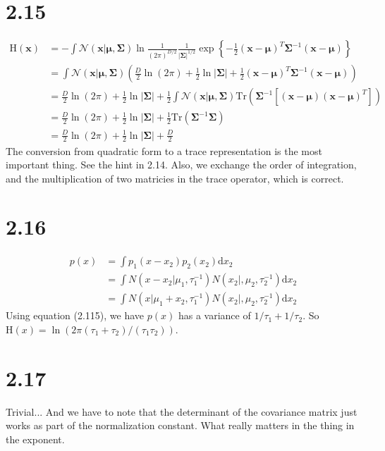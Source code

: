 \documentclass[12pt]{article}
\newcommand{\vect}[1]{\mathbf{#1}}
\begin{document}
\section{2.15}
\begin{align}
    \mathrm{H}(\vect{x} ) &= -\int \mathcal{N}(\vect{x}|\boldsymbol{\mu}, \boldsymbol{\Sigma}) \ln\frac{1}{(2\pi)^{D/2}} \frac{1}{|\boldsymbol{\Sigma}|^{1/2}} \exp\left\{-\frac{1}{2}(\vect{x} - \boldsymbol{\mu})^T \boldsymbol{\Sigma}^{-1} (\vect{x} - \boldsymbol{\mu}) \right\}  \\
    &=\int \mathcal{N}(\vect{x}|\boldsymbol{\mu}, \boldsymbol{\Sigma}) 
    (\frac{D}{2}  \ln (2\pi)+\frac{1}{2}\ln|\boldsymbol{\Sigma}| + \frac{1}{2}(\vect{x} - \boldsymbol{\mu})^T \boldsymbol{\Sigma}^{-1} (\vect{x} - \boldsymbol{\mu}))\\
    &=\frac{D}{2}  \ln (2\pi) + \frac{1}{2}\ln|\boldsymbol{\Sigma}| + 
    \frac{1}{2}\int \mathcal{N}(\vect{x}|\boldsymbol{\mu}, \boldsymbol{\Sigma})\mathrm{Tr}(\boldsymbol{\Sigma}^{-1}  \left[    (\vect{x} - \boldsymbol{\mu})  (\vect{x} - \boldsymbol{\mu})^T     \right] )\\
    &=\frac{D}{2}  \ln (2\pi) + \frac{1}{2}\ln|\boldsymbol{\Sigma}| +
    \frac{1}{2} \mathrm{Tr}(\boldsymbol{\Sigma}^{-1} \boldsymbol{\Sigma} ) \\
    &=\frac{D}{2}  \ln (2\pi) + \frac{1}{2}\ln|\boldsymbol{\Sigma}| + \frac{D}{2}
\end{align} 
The conversion from quadratic form to a trace representation is the most important thing. See the hint in 2.14. Also, we exchange the order of integration, and the multiplication of two matricies in the trace operator, which is correct.

\section{2.16}
\begin{align}
    p(x) &= \int p_1(x-x_2) p_2(x_2) \mathrm{d} x_2 \\
    & = \int N(x - x_2|\mu_1, \tau_1^{-1}) N(x_2|, \mu_2, \tau_2^{-1}) \mathrm{d} x_2 \\
    & = \int N(x|\mu_1+x_2, \tau_1^{-1}) N(x_2|, \mu_2, \tau_2^{-1}) \mathrm{d} x_2
\end{align}
Using equation (2.115), we have $p(x)$ has a variance of $1/\tau_1 + 1/\tau_2$. So $\mathrm{H}(x) = \ln(2\pi (\tau_1+\tau_2)/(\tau_1\tau_2)) $.


\section{2.17}
Trivial... And we have to note that the determinant of the covariance matrix just works as part of the normalization constant. What really matters in the thing in the exponent.
\end{document}
